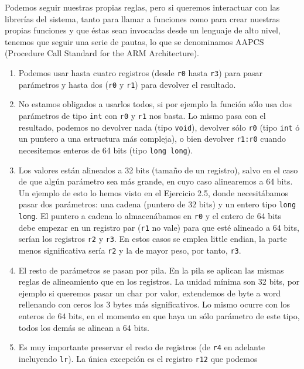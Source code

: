 Podemos seguir nuestras propias reglas, pero si queremos interactuar con las librerías
del sistema, tanto para llamar a funciones como para crear nuestras propias funciones
y que éstas sean invocadas desde un lenguaje de alto nivel, tenemos que seguir una serie
de pautas, lo que se denominamos AAPCS (Procedure Call Standard for the ARM Architecture).

\begin{enumerate}
  \item Podemos usar hasta cuatro registros (desde {\tt r0} hasta {\tt r3}) para pasar
        parámetros y hasta dos ({\tt r0} y {\tt r1}) para devolver el resultado.\newline
  \item No estamos obligados a usarlos todos, si por ejemplo la función sólo usa dos parámetros
        de tipo {\tt int} con {\tt r0} y {\tt r1} nos basta. Lo mismo pasa con el resultado,
        podemos no devolver nada (tipo {\tt void}), devolver sólo {\tt r0} (tipo {\tt int} ó un puntero
        a una estructura más compleja), o bien devolver {\tt r1:r0} cuando necesitemos enteros
        de 64 bits (tipo {\tt long long}).
  \item Los valores están alineados a 32 bits (tamaño de un registro), salvo en el caso de que
        algún parámetro sea más grande, en cuyo caso alinearemos a 64 bits. Un ejemplo de esto
        lo hemos visto en el Ejercicio 2.5, donde necesitábamos pasar dos parámetros: una cadena
        (puntero de 32 bits) y un entero tipo {\tt long long}. El puntero a cadena lo almacenábamos
        en {\tt r0} y el entero de 64 bits debe empezar en un registro par ({\tt r1} no vale)
        para que esté alineado a 64 bits, serían los registros {\tt r2} y {\tt r3}. En estos casos
        se emplea little endian, la parte menos significativa sería {\tt r2} y la de mayor peso, por
        tanto, {\tt r3}.
  \item El resto de parámetros se pasan por pila. En la pila se aplican las mismas reglas de
        alineamiento que en los registros. La unidad mínima son 32 bits, por ejemplo si queremos
        pasar un char por valor, extendemos de byte a word rellenando con ceros los 3 bytes
        más significativos. Lo mismo ocurre con los enteros de 64 bits, en el momento en que haya
        un sólo parámetro de este tipo, todos los demás se alinean a 64 bits.
  \item Es muy importante preservar el resto de registros (de {\tt r4} en
        adelante incluyendo {\tt lr}). La única excepción es el registro {\tt r12} que podemos

\end{enumerate}
